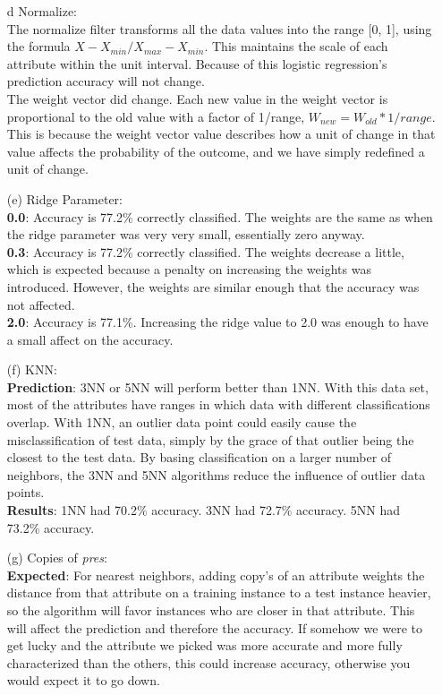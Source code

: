 \documentclass[12pt]{article}
\begin{document}
\begin{enumerate}
\begin{enumerate}
  	\item[{d}] Normalize: \\
	  	The normalize filter transforms all the data values into the range [0, 1], using the formula $X - X_{min} / X_{max} - X_{min}$. This maintains the scale of each attribute within the unit interval.  Because of this logistic regression's prediction accuracy will not change.  \\
		The weight vector did change. Each new value in the weight vector is proportional to the old value with a factor of 1/range, $W_{new} = W_{old} * 1/range$. This is because the weight vector value describes how a unit of change in that value affects the probability of the outcome, and we have simply redefined a unit of change. \\	 
	 \item[(e)] Ridge Parameter: \\
	 	  		\textbf{0.0}: Accuracy is 77.2\% correctly classified. The weights are the same as when the ridge parameter was very very small, essentially zero anyway. \\
	 	  		\textbf{0.3}: Accuracy is 77.2\% correctly classified. The weights decrease a little, which is expected because a penalty on increasing the weights was introduced. However, the weights are similar enough that the accuracy was not affected. \\
	 	  		\textbf{2.0}: Accuracy is 77.1\%. Increasing the ridge value to 2.0 was enough to have a small affect on the accuracy. 
	 \item[(f)] KNN: \\
	 			\textbf{Prediction}: 3NN or 5NN will perform better than 1NN. With this data set, most of the attributes have ranges in which data with different classifications overlap. With 1NN, an outlier data point could easily cause the misclassification of test data, simply by the grace of that outlier being the closest to the test data. By basing classification on a larger number of neighbors, the 3NN and 5NN algorithms reduce the influence of outlier data points.  \\
	 			\textbf{Results}: 1NN had 70.2\% accuracy. 3NN had 72.7\% accuracy. 5NN had 73.2\% accuracy.  \\
	 \item[(g)] Copies of \textit{pres}: \\
	 	\textbf{Expected}:  For nearest neighbors, adding copy's of an attribute weights the distance from that attribute on a training instance to a test instance heavier, so the algorithm will favor instances who are closer in that attribute. This will affect the prediction and therefore the accuracy. If somehow we were to get lucky and the attribute we picked was more accurate and more fully characterized than the others, this could increase accuracy, otherwise you would expect it to go down.\\

\end{enumerate}
\end{enumerate}
\end{document}
